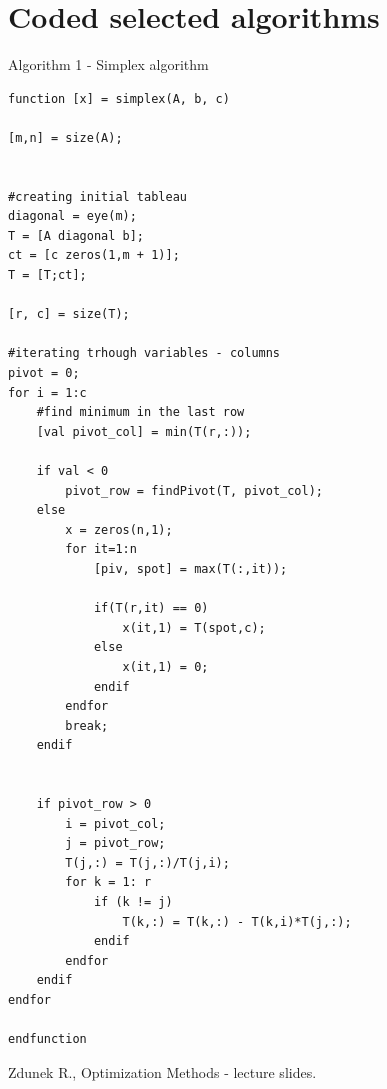 \documentclass[eng,openany]{mgr}
\begin{document}
\section{Coded selected algorithms}
Algorithm 1 - Simplex algorithm\\ 
\begin{lstlisting}
function [x] = simplex(A, b, c)

[m,n] = size(A);


#creating initial tableau
diagonal = eye(m);
T = [A diagonal b];
ct = [c zeros(1,m + 1)];
T = [T;ct];

[r, c] = size(T);

#iterating trhough variables - columns
pivot = 0;
for i = 1:c
	#find minimum in the last row
	[val pivot_col] = min(T(r,:));
	
	if val < 0
		pivot_row = findPivot(T, pivot_col);
	else
		x = zeros(n,1);
		for it=1:n
			[piv, spot] = max(T(:,it));
			
			if(T(r,it) == 0)
				x(it,1) = T(spot,c);
			else 
				x(it,1) = 0;
			endif
		endfor
		break;
	endif
	
	
	if pivot_row > 0
		i = pivot_col;
		j = pivot_row;
		T(j,:) = T(j,:)/T(j,i);
		for k = 1: r
			if (k != j)
				T(k,:) = T(k,:) - T(k,i)*T(j,:);
			endif
		endfor
	endif
endfor

endfunction
\end{lstlisting}
\begin{thebibliography}{8}
Zdunek R., Optimization Methods - lecture slides.
\end{thebibliography}
\end{document}
